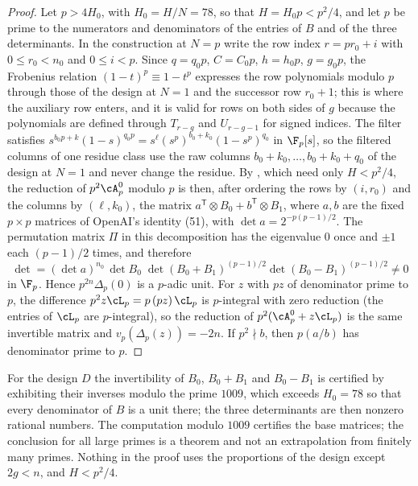 \begin{proof}
Let $p>4H_0$, with $H_0=H/N=78$, so that $H=H_0p<p^2/4$, and let $p$ be prime to the numerators and denominators
of the entries of $B$ and of the three determinants. In the construction at $N=p$ write the row index
$r=pr_0+i$ with $0\le r_0<n_0$ and $0\le i<p$. Since $q=q_0p$, $C=C_0p$, $h=h_0p$, $g=g_0p$, the Frobenius
relation $(1-t)^{p}\equiv1-t^p$ expresses the row polynomials modulo $p$ through those of the design at
$N=1$ and the successor row $r_0+1$; this is where the auxiliary row enters, and it is valid for rows on
both sides of $g$ because the polynomials are defined through $T_{r-g}$ and $U_{r-g-1}$ for signed
indices. The filter satisfies $s^{b_0p+k}(1-s)^{q_0p}=s^{\ell}(s^p)^{b_0+k_0}(1-s^p)^{q_0}$ in $\F_p[s]$, so
the filtered columns of one residue class use the raw columns $b_0+k_0,\dots,b_0+k_0+q_0$ of the design at
$N=1$ and never change the residue. By \cite[Lemma~3.1 and eqs.~(31), (35), (36)]{OpenAI2026}, which
need only $H<p^2/4$, the reduction of $p^2\cA^0_p$ modulo $p$ is then, after ordering the rows by $(i,r_0)$ and
the columns by $(\ell,k_0)$, the matrix $a^{\mathsf T}\otimes B_0+b^{\mathsf T}\otimes B_1$, where $a,b$ are the
fixed $p\times p$ matrices of OpenAI's identity (51), with $\det a=2^{-p(p-1)/2}$. The permutation
matrix $\Pi$ in this decomposition has the eigenvalue $0$ once and $\pm1$ each $(p-1)/2$ times, and
therefore
\[
 \det=(\det a)^{n_0}\,\det B_0\;\det(B_0+B_1)^{(p-1)/2}\det(B_0-B_1)^{(p-1)/2}\ne0
\]
in $\F_p$. Hence $p^{2n}\Delta_p(0)$ is a $p$-adic unit. For $z$ with $pz$ of denominator prime to $p$, the
difference $p^2z\cL_p=p\,(pz)\,\cL_p$ is $p$-integral with zero reduction (the entries of $\cL_p$ are
$p$-integral), so the reduction of $p^2(\cA^0_p+z\cL_p)$ is the same invertible matrix and
$v_p(\Delta_p(z))=-2n$. If $p^2\nmid b$, then $p(a/b)$ has denominator prime to $p$.
\end{proof}

For the design $D$ the invertibility of $B_0$, $B_0+B_1$ and $B_0-B_1$ is certified by exhibiting their
inverses modulo the prime $1009$, which exceeds $H_0=78$ so that every denominator of $B$ is a unit
there; the three determinants are then nonzero rational numbers. The computation modulo $1009$ certifies
the base matrices; the conclusion for all large primes is a theorem and not an extrapolation from
finitely many primes. Nothing in the proof uses the proportions of the design except $2g<n$, and $H<p^2/4$.
